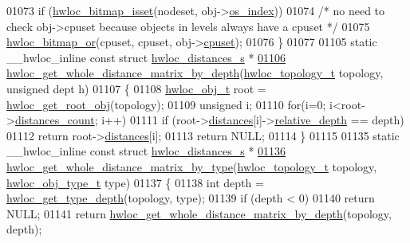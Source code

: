 \begin{DoxyCode}
{{01073                 \textcolor{keywordflow}{if} (\hyperlink{a00065_ga2583f44cbdb5fff2ea40efdcf3975d3f}{hwloc_bitmap_isset}(nodeset, obj->\hyperlink{a00016_a61a7a80a68eaccbaaa28269e678c81a9}{os_index}))
01074                         \textcolor{comment}{/* no need to check obj->cpuset because objects in levels
       always have a cpuset */}
01075                         \hyperlink{a00065_ga1ba1de709ee9a7cf5cc8ad2d9a1a81d4}{hwloc_bitmap_or}(cpuset, cpuset, obj->\hyperlink{a00016_a67925e0f2c47f50408fbdb9bddd0790f}{cpuset});
01076 \}
01077 
01105 \textcolor{keyword}{static} \_\_hwloc\_inline \textcolor{keyword}{const} \textcolor{keyword}{struct }\hyperlink{a00014}{hwloc_distances_s} *
\hypertarget{a00031_source_l01106}{}\hyperlink{a00063_ga48dfec8b8ba1fb8f2073ecd0728f0ca6}{01106} \hyperlink{a00063_ga48dfec8b8ba1fb8f2073ecd0728f0ca6}{hwloc_get_whole_distance_matrix_by_depth}(\hyperlink{a00039_ga9d1e76ee15a7dee158b786c30b6a6e38}{hwloc_topology_t} topology, \textcolor{keywordtype}{unsigned} dept
      h)
01107 \{
01108   \hyperlink{a00016}{hwloc_obj_t} root = \hyperlink{a00053_gadbf58f6e187efbdb3cd9a8e30311b7d7}{hwloc_get_root_obj}(topology);
01109   \textcolor{keywordtype}{unsigned} i;
01110   \textcolor{keywordflow}{for}(i=0; i<root->\hyperlink{a00016_a8be6f63eca4da91000c832280db927b7}{distances_count}; i++)
01111     \textcolor{keywordflow}{if} (root->\hyperlink{a00016_a9a5dd75596edc48fe834f81988cdc0d6}{distances}[i]->\hyperlink{a00014_a6fe066eaf62ee448aa05bab8e7217ff7}{relative_depth} == depth)
01112       \textcolor{keywordflow}{return} root->\hyperlink{a00016_a9a5dd75596edc48fe834f81988cdc0d6}{distances}[i];
01113   \textcolor{keywordflow}{return} NULL;
01114 \}
01115 
01135 \textcolor{keyword}{static} \_\_hwloc\_inline \textcolor{keyword}{const} \textcolor{keyword}{struct }\hyperlink{a00014}{hwloc_distances_s} *
\hypertarget{a00031_source_l01136}{}\hyperlink{a00063_ga9979237728f7a00a38836e15a8e8cd17}{01136} \hyperlink{a00063_ga9979237728f7a00a38836e15a8e8cd17}{hwloc_get_whole_distance_matrix_by_type}(\hyperlink{a00039_ga9d1e76ee15a7dee158b786c30b6a6e38}{hwloc_topology_t} topology, 
      \hyperlink{a00041_gacd37bb612667dc437d66bfb175a8dc55}{hwloc_obj_type_t} type)
01137 \{
01138   \textcolor{keywordtype}{int} depth = \hyperlink{a00046_gaea7c64dd59467f5201ba87712710b14d}{hwloc_get_type_depth}(topology, type);
01139   \textcolor{keywordflow}{if} (depth < 0)
01140     \textcolor{keywordflow}{return} NULL;
01141   \textcolor{keywordflow}{return} \hyperlink{a00063_ga48dfec8b8ba1fb8f2073ecd0728f0ca6}{hwloc_get_whole_distance_matrix_by_depth}(topology, depth);
}}
\end{DoxyCode}
